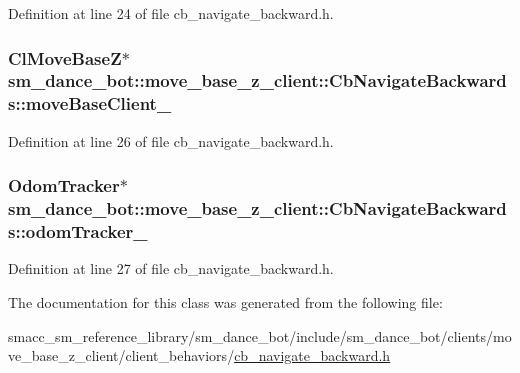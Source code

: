 Definition at line 24 of file cb\+\_\+navigate\+\_\+backward.\+h.

\subsubsection[{\texorpdfstring{move\+Base\+Client\+\_\+}{moveBaseClient_}}]{\setlength{\rightskip}{0pt plus 5cm}Cl\+Move\+BaseZ$\ast$ sm\+\_\+dance\+\_\+bot\+::move\+\_\+base\+\_\+z\+\_\+client\+::\+Cb\+Navigate\+Backwards\+::move\+Base\+Client\+\_\+}\hypertarget{classsm__dance__bot_1_1move__base__z__client_1_1CbNavigateBackwards_a566448c392e347b21c51126572421603}{}\label{classsm__dance__bot_1_1move__base__z__client_1_1CbNavigateBackwards_a566448c392e347b21c51126572421603}


Definition at line 26 of file cb\+\_\+navigate\+\_\+backward.\+h.

\subsubsection[{\texorpdfstring{odom\+Tracker\+\_\+}{odomTracker_}}]{\setlength{\rightskip}{0pt plus 5cm}Odom\+Tracker$\ast$ sm\+\_\+dance\+\_\+bot\+::move\+\_\+base\+\_\+z\+\_\+client\+::\+Cb\+Navigate\+Backwards\+::odom\+Tracker\+\_\+}\hypertarget{classsm__dance__bot_1_1move__base__z__client_1_1CbNavigateBackwards_abd9c4cd5af4af4da2713a77dcb599a5f}{}\label{classsm__dance__bot_1_1move__base__z__client_1_1CbNavigateBackwards_abd9c4cd5af4af4da2713a77dcb599a5f}


Definition at line 27 of file cb\+\_\+navigate\+\_\+backward.\+h.



The documentation for this class was generated from the following file\+:\begin{DoxyCompactItemize}
\item 
smacc\+\_\+sm\+\_\+reference\+\_\+library/sm\+\_\+dance\+\_\+bot/include/sm\+\_\+dance\+\_\+bot/clients/move\+\_\+base\+\_\+z\+\_\+client/client\+\_\+behaviors/\hyperlink{smacc__sm__reference__library_2sm__dance__bot_2include_2sm__dance__bot_2clients_2move__base__z__4f2aa30834ea1c7ed1eb80e835162070}{cb\+\_\+navigate\+\_\+backward.\+h}\end{DoxyCompactItemize}
